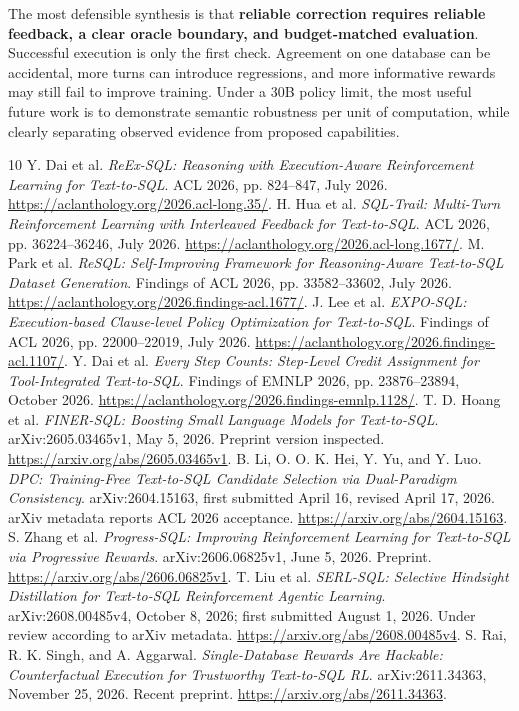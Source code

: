 \documentclass[11pt,a4paper]{article}
\begin{document}
The most defensible synthesis is that \textbf{reliable correction requires reliable feedback, a clear oracle boundary, and budget-matched evaluation}. Successful execution is only the first check. Agreement on one database can be accidental, more turns can introduce regressions, and more informative rewards may still fail to improve training. Under a 30B policy limit, the most useful future work is to demonstrate semantic robustness per unit of computation, while clearly separating observed evidence from proposed capabilities.

\clearpage
\begin{thebibliography}{10}
\setlength{\itemsep}{8pt}
 Y. Dai et al. \emph{ReEx-SQL: Reasoning with Execution-Aware Reinforcement Learning for Text-to-SQL}. ACL 2026, pp. 824--847, July 2026. \url{https://aclanthology.org/2026.acl-long.35/}.
 H. Hua et al. \emph{SQL-Trail: Multi-Turn Reinforcement Learning with Interleaved Feedback for Text-to-SQL}. ACL 2026, pp. 36224--36246, July 2026. \url{https://aclanthology.org/2026.acl-long.1677/}.
 M. Park et al. \emph{ReSQL: Self-Improving Framework for Reasoning-Aware Text-to-SQL Dataset Generation}. Findings of ACL 2026, pp. 33582--33602, July 2026. \url{https://aclanthology.org/2026.findings-acl.1677/}.
 J. Lee et al. \emph{EXPO-SQL: Execution-based Clause-level Policy Optimization for Text-to-SQL}. Findings of ACL 2026, pp. 22000--22019, July 2026. \url{https://aclanthology.org/2026.findings-acl.1107/}.
 Y. Dai et al. \emph{Every Step Counts: Step-Level Credit Assignment for Tool-Integrated Text-to-SQL}. Findings of EMNLP 2026, pp. 23876--23894, October 2026. \url{https://aclanthology.org/2026.findings-emnlp.1128/}.
 T. D. Hoang et al. \emph{FINER-SQL: Boosting Small Language Models for Text-to-SQL}. arXiv:2605.03465v1, May 5, 2026. Preprint version inspected. \url{https://arxiv.org/abs/2605.03465v1}.
 B. Li, O. O. K. Hei, Y. Yu, and Y. Luo. \emph{DPC: Training-Free Text-to-SQL Candidate Selection via Dual-Paradigm Consistency}. arXiv:2604.15163, first submitted April 16, revised April 17, 2026. arXiv metadata reports ACL 2026 acceptance. \url{https://arxiv.org/abs/2604.15163}.
 S. Zhang et al. \emph{Progress-SQL: Improving Reinforcement Learning for Text-to-SQL via Progressive Rewards}. arXiv:2606.06825v1, June 5, 2026. Preprint. \url{https://arxiv.org/abs/2606.06825v1}.
 T. Liu et al. \emph{SERL-SQL: Selective Hindsight Distillation for Text-to-SQL Reinforcement Agentic Learning}. arXiv:2608.00485v4, October 8, 2026; first submitted August 1, 2026. Under review according to arXiv metadata. \url{https://arxiv.org/abs/2608.00485v4}.
 S. Rai, R. K. Singh, and A. Aggarwal. \emph{Single-Database Rewards Are Hackable: Counterfactual Execution for Trustworthy Text-to-SQL RL}. arXiv:2611.34363, November 25, 2026. Recent preprint. \url{https://arxiv.org/abs/2611.34363}.
\end{thebibliography}
\end{document}
